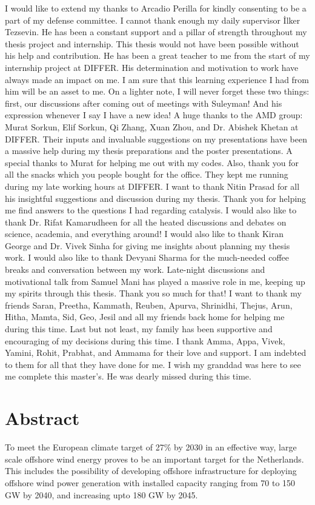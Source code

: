 I would like to extend my thanks to Arcadio Perilla for kindly consenting to be a part of my defense committee.
I cannot thank enough my daily supervisor İlker Tezsevin. He has been a constant support and a pillar of strength throughout my thesis project and internship. This thesis would not have been possible without his help and contribution. He has been a great teacher to me from the start of my internship project at DIFFER. His determination and motivation to work have always made an impact on me. I am sure that this learning experience I had from him will be an asset to me. On a lighter note, I will never forget these two things: first, our discussions after coming out of meetings with Suleyman! And his expression whenever I say I have a new idea!
A huge thanks to the AMD group: Murat Sorkun, Elif Sorkun, Qi Zhang, Xuan Zhou, and Dr. Abishek Khetan at DIFFER. Their inputs and invaluable suggestions on my presentations have been a massive help during my thesis preparations and the poster presentations. A special thanks to Murat for helping me out with my codes. Also, thank you for all the snacks which you people bought for the office. They kept me running during my late working hours at DIFFER.
I want to thank Nitin Prasad for all his insightful suggestions and discussion during my thesis. Thank you for helping me find answers to the questions I had regarding catalysis. I would also like to thank Dr. Rifat Kamarudheen for all the heated discussions and debates on science, academia, and everything around! I would also like to thank Kiran George and Dr. Vivek Sinha for giving me insights about planning my thesis work. I would also like to thank Devyani Sharma for the much-needed coffee breaks and conversation between my work. Late-night discussions and motivational talk from Samuel Mani has played a massive role in me, keeping up my spirits through this thesis. Thank you so much for that! I want to thank my friends Saran, Preetha, Kammath, Reuben, Apurva, Shrinidhi, Thejus, Arun, Hitha, Mamta, Sid, Geo, Jesil and all my friends back home for helping me during this time.
Last but not least, my family has been supportive and encouraging of my decisions during this time. I thank Amma, Appa, Vivek, Yamini, Rohit, Prabhat, and Ammama for their love and support. I am indebted to them for all that they have done for me. I wish my granddad was here to see me complete this master's. He was dearly missed during this time.




\newpage
\chapter*{Abstract}
To meet the European climate target of 27\% by 2030 in an effective way, large scale offshore wind energy proves to be an important target for the Netherlands. %
This includes the possibility of developing offshore infrastructure for deploying offshore wind power generation with installed capacity ranging from 70 to 150 GW by 2040, and increasing upto 180 GW by 2045. 

